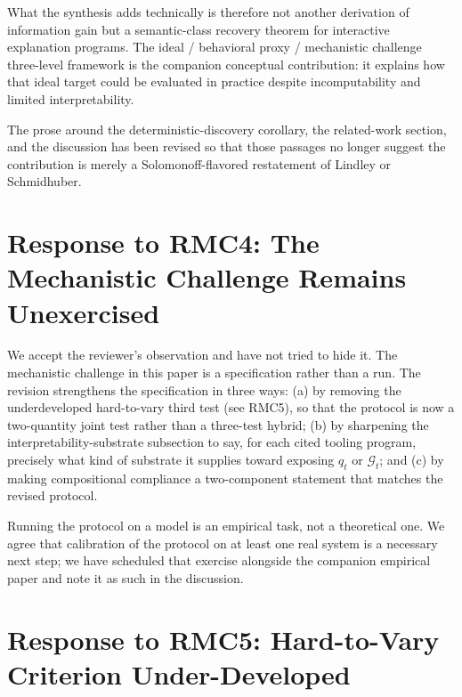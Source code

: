 \documentclass[11pt]{article}
\begin{document}
What the synthesis adds technically is therefore not another derivation of information gain but a semantic-class recovery theorem for interactive explanation programs. The ideal / behavioral proxy / mechanistic challenge three-level framework is the companion conceptual contribution: it explains how that ideal target could be evaluated in practice despite incomputability and limited interpretability.

The prose around the deterministic-discovery corollary, the related-work section, and the discussion has been revised so that those passages no longer suggest the contribution is merely a Solomonoff-flavored restatement of Lindley or Schmidhuber.

\section*{Response to RMC4: The Mechanistic Challenge Remains Unexercised}

We accept the reviewer's observation and have not tried to hide it. The mechanistic challenge in this paper is a specification rather than a run. The revision strengthens the specification in three ways: (a) by removing the underdeveloped hard-to-vary third test (see RMC5), so that the protocol is now a two-quantity joint test rather than a three-test hybrid; (b) by sharpening the interpretability-substrate subsection to say, for each cited tooling program, precisely what kind of substrate it supplies toward exposing $q_t$ or $\mathcal{G}_t$; and (c) by making compositional compliance a two-component statement that matches the revised protocol.

Running the protocol on a model is an empirical task, not a theoretical one. We agree that calibration of the protocol on at least one real system is a necessary next step; we have scheduled that exercise alongside the companion empirical paper and note it as such in the discussion.

\section*{Response to RMC5: Hard-to-Vary Criterion Under-Developed}
\end{document}
